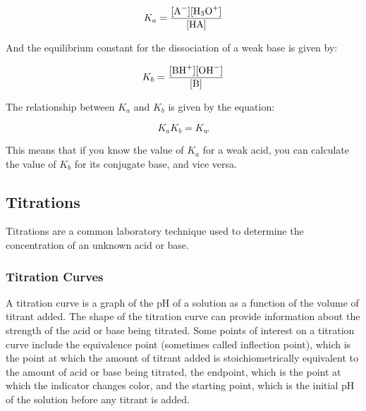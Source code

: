 \begin{equation}\label{eq:Ka}
    K_a = \frac{[\ce{A-}] [\ce{H3O+}]}{[\ce{HA}]}
\end{equation}

And the equilibrium constant for the dissociation of a weak base is given by:

\begin{equation}\label{eq:Kb}
    K_b = \frac{[\ce{BH+}] [\ce{OH-}]}{[\ce{B}]}
\end{equation}

The relationship between $K_a$ and $K_b$ is given by the equation:

\begin{equation}\label{eq:KaKb}
    K_a K_b = K_w
\end{equation}

This means that if you know the value of $K_a$ for a weak acid, you can calculate the value of $K_b$ for its conjugate base, and vice versa. 

\subsection{Titrations}

Titrations are a common laboratory technique used to determine the concentration of an unknown acid or base. 

\subsubsection{Titration Curves}

A titration curve is a graph of the pH of a solution as a function of the volume of titrant added. The shape of the titration curve can provide information about the strength of the acid or base being titrated. Some points of interest on a titration curve include the equivalence point (sometimes called inflection point), which is the point at which the amount of titrant added is stoichiometrically equivalent to the amount of acid or base being titrated, the endpoint, which is the point at which the indicator changes color, and the starting point, which is the initial pH of the solution before any titrant is added.

